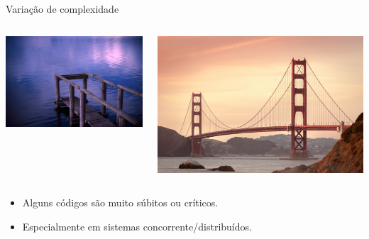 \begin{frame}{Variação de complexidade}\small

  \begin{columns}
    \begin{column}{.5\textwidth}
      \begin{center}
        \includegraphics[scale=0.2]{simplebridge.png}
      \end{center}
    \end{column}

    \begin{column}{.5\textwidth}
      \begin{center}
        \includegraphics[scale=0.15]{complexbridge.png}        
      \end{center}
    \end{column}
  \end{columns}

  \begin{itemize}
  \item<2-> Alguns códigos são muito súbitos ou críticos.
  \item<3-> Especialmente em sistemas concorrente/distribuídos.
  \end{itemize}
  
\end{frame}

